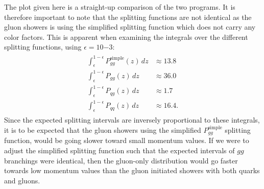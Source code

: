 \documentclass[main.tex]{subfiles}
\begin{document}
The plot given here is a straight-up comparison of the two programs. It is therefore important to note that the splitting functions are not identical as the gluon showers is using the simplified splitting function which does not carry any color factors. This is apparent when examining the integrals over the different splitting functions, using \(\epsilon = 10{-3}\):
\begin{align}
\begin{split}
    \int_\epsilon^{1-\epsilon} P_{gg}^{\text{simple}}(z)\,dz &\approx 13.8\\ \int_\epsilon^{1-\epsilon} P_{gg}(z)\,dz &\approx 36.0\\ 
    \int_\epsilon^{1-\epsilon} P_{qg}(z)\,dz &\approx 1.7 \\
    \int_\epsilon^{1-\epsilon} P_{qq}(z)\,dz &\approx 16.4.
\end{split}
\end{align}
Since the expected splitting intervals are inversely proportional to these integrals, it is to be expected that the gluon showers using the simplified \(P_{gg}^{\text{simple}}\) splitting function, would be going slower toward small momentum values. If we were to adjust the simplified splitting function such that the expected intervals of \(gg\) branchings were identical, then the gluon-only distribution would go faster towards low momentum values than the gluon initiated showers with both quarks and gluons. 
\end{document}
